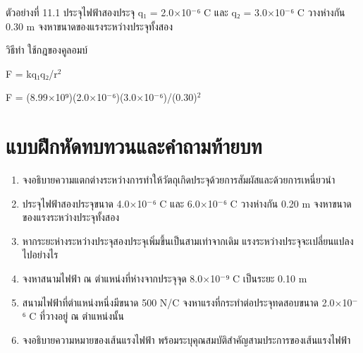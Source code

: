 \begin{examplebox}
ตัวอย่างที่ 11.1 ประจุไฟฟ้าสองประจุ q₁ = 2.0$\times$10$^-$⁶ C และ q₂ = 3.0$\times$10$^-$⁶ C วางห่างกัน 0.30 m จงหาขนาดของแรงระหว่างประจุทั้งสอง

วิธีทำ ใช้กฎของคูลอมบ์

F = kq₁q₂/r$^2$

F = (8.99$\times$10⁹)(2.0$\times$10$^-$⁶)(3.0$\times$10$^-$⁶)/(0.30)$^2$
\end{examplebox}

\section{แบบฝึกหัดทบทวนและคำถามท้ายบท}

\begin{enumerate}
    \item จงอธิบายความแตกต่างระหว่างการทำให้วัตถุเกิดประจุด้วยการสัมผัสและด้วยการเหนี่ยวนำ
    \item ประจุไฟฟ้าสองประจุขนาด 4.0$\times$10$^-$⁶ C และ 6.0$\times$10$^-$⁶ C วางห่างกัน 0.20 m จงหาขนาดของแรงระหว่างประจุทั้งสอง
    \item หากระยะห่างระหว่างประจุสองประจุเพิ่มขึ้นเป็นสามเท่าจากเดิม แรงระหว่างประจุจะเปลี่ยนแปลงไปอย่างไร
    \item จงหาสนามไฟฟ้า ณ ตำแหน่งที่ห่างจากประจุจุด 8.0$\times$10$^-$⁹ C เป็นระยะ 0.10 m
    \item สนามไฟฟ้าที่ตำแหน่งหนึ่งมีขนาด 500 N/C จงหาแรงที่กระทำต่อประจุทดสอบขนาด 2.0$\times$10$^-$⁶ C ที่วางอยู่ ณ ตำแหน่งนั้น
    \item จงอธิบายความหมายของเส้นแรงไฟฟ้า พร้อมระบุคุณสมบัติสำคัญสามประการของเส้นแรงไฟฟ้า
\end{enumerate}

